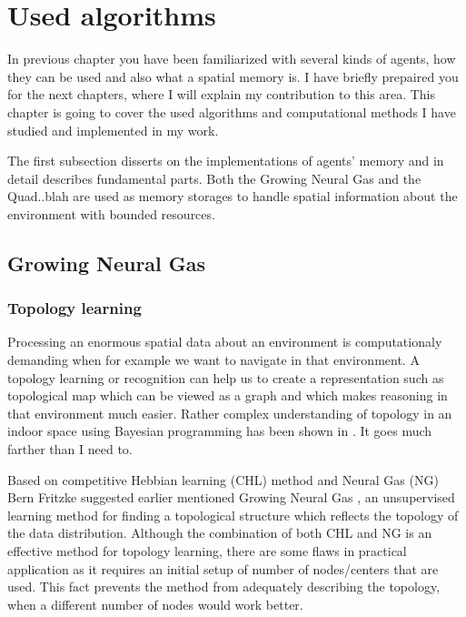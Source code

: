 \chapter{Used algorithms}

In previous chapter you have been familiarized with several kinds of agents, how they can be used and also what a spatial memory is. I have briefly prepaired you for the next chapters, where I will explain my contribution to this area. This chapter is going to cover the used algorithms and computational methods I have studied and implemented in my work. 

The first subsection disserts on the implementations of agents' memory and in detail describes fundamental parts. Both the Growing Neural Gas and the Quad..blah are used as memory storages to handle spatial information about the environment with bounded resources.

\section{Growing Neural Gas}

\subsection{Topology learning}

Processing an enormous spatial data about an environment is computationaly demanding when for example we want to navigate in that environment. A topology learning or recognition can help us to create a representation such as topological map which can be viewed as a graph and which makes reasoning in that environment much easier. Rather complex understanding of topology in an indoor space using Bayesian programming has been shown in \cite{Tapus:topologylearning}. It goes much farther than I need to. 

Based on competitive Hebbian learning (CHL) method \cite{Martinetz:chl} and Neural Gas (NG) \cite{Martinetz:ng} Bern Fritzke suggested earlier mentioned Growing Neural Gas \cite{Fritzke:gng}, an unsupervised learning method for finding a topological structure which reflects the topology of the data distribution. Although the combination of both CHL and NG is an effective method for topology learning, there are some flaws in practical application as it requires an initial setup of number of nodes/centers that are used. This fact prevents the method from adequately describing the topology, when a different number of nodes would work better.

